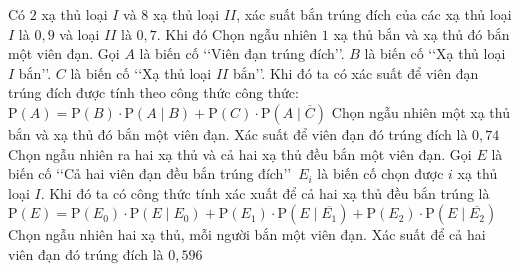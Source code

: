 \begin{ex}%
	Có $2$ xạ thủ loại $I$ và $8$ xạ thủ loại $II$, xác  suất bắn trúng đích của các xạ thủ loại $I$ là $0{,}9$ và loại $II$ là $0{,}7$. Khi đó
	 \choiceTF
		{Chọn ngẫu nhiên $1$ xạ thủ bắn và xạ thủ đó bắn một viên đạn. Gọi $A$ là biến cố \lq\lq Viên đạn trúng đích\rq\rq. $B$ là biến cố \lq\lq Xạ thủ loại $I$ bắn\rq\rq. $C$ là biến cố \lq\lq Xạ thủ loại $II$ bắn\rq\rq. Khi đó ta có xác suất để viên  đạn trúng đích được tính theo công thức công thức:
		$\mathrm{P}(A)=\mathrm{P}(B) \cdot  \mathrm{P}(A\mid B)+\mathrm{P}(C)\cdot\mathrm{P}\left(A\mid \overline{C}\right)$}
		{\True Chọn ngẫu nhiên một xạ thủ bắn và xạ thủ đó bắn một viên đạn. Xác suất để viên đạn đó trúng đích là  $0{,}74$}
		{Chọn  ngẫu nhiên ra hai xạ thủ và cả hai xạ thủ đều bắn một viên đạn. Gọi $E$ là biến cố \lq\lq Cả hai viên đạn đều bắn trúng đích\rq\rq\, $E_{i} $ là biến cố chọn được $i$ xạ thủ loại $I$. Khi đó ta có công thức tính xác xuất để cả hai xạ thủ đều bắn trúng là\\
		$\mathrm{P}(E)=\mathrm{P}(E_{0})\cdot\mathrm{P}(E\mid  E_{0})+\mathrm{P}(E_{1})\cdot\mathrm{P}\left(E\mid \overline{E_{1} }\right)+\mathrm{P}(E_{2})\cdot\mathrm{P}\left(E\mid \overline{E_{2} }\right)$}
		{Chọn ngẫu nhiên hai  xạ thủ, mỗi người bắn một viên đạn. Xác suất để cả hai viên đạn đó trúng đích là $0{,}596$}
\end{ex}
